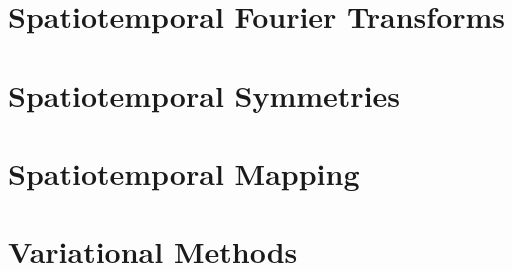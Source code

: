%
%
\section{Spatiotemporal Fourier Transforms}

\section{Spatiotemporal Symmetries}

\section{Spatiotemporal Mapping}

\section{Variational Methods}
 